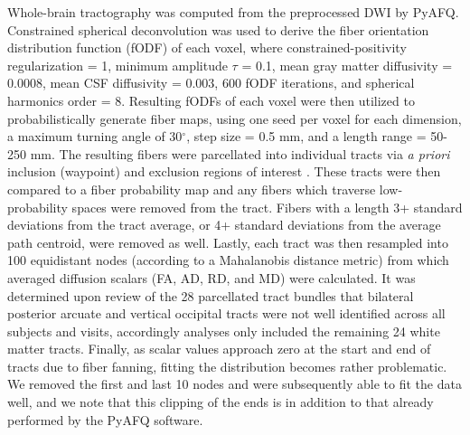 \documentclass[12pt]{article}
\begin{document}
Whole-brain tractography was computed from the preprocessed DWI by PyAFQ. Constrained spherical deconvolution was used to derive the fiber orientation distribution function (fODF) of each voxel, where constrained-positivity regularization = 1, minimum amplitude $\tau$ = 0.1, mean gray matter diffusivity = 0.0008, mean CSF diffusivity = 0.003, 600 fODF iterations, and spherical harmonics order = 8. Resulting fODFs of each voxel were then utilized to probabilistically generate fiber maps, using one seed per voxel for each dimension, a maximum turning angle of 30$^\circ$, step size = 0.5 mm, and a length range = 50-250 mm. The resulting fibers were parcellated into individual tracts via \textit{a priori} inclusion (waypoint) and exclusion regions of interest \parencite{wakana2007ReproducibilityQuantitativeTractography}. These tracts were then compared to a fiber probability map \parencite{hua2008TractProbabilityMaps} and any fibers which traverse low-probability spaces were removed from the tract. Fibers with a length 3+ standard deviations from the tract average, or 4+ standard deviations from the average path centroid, were removed as well. Lastly, each tract was then resampled into 100 equidistant nodes (according to a Mahalanobis distance metric) from which averaged diffusion scalars (FA, AD, RD, and MD) were calculated. It was determined upon review of the 28 parcellated tract bundles that bilateral posterior arcuate and vertical occipital tracts were not well identified across all subjects and visits, accordingly analyses only included the remaining 24 white matter tracts. Finally, as scalar values approach zero at the start and end of tracts due to fiber fanning, fitting the distribution becomes rather problematic. We removed the first and last 10 nodes and were subsequently able to fit the data well, and we note that this clipping of the ends is in addition to that already performed by the PyAFQ software.
\end{document}
